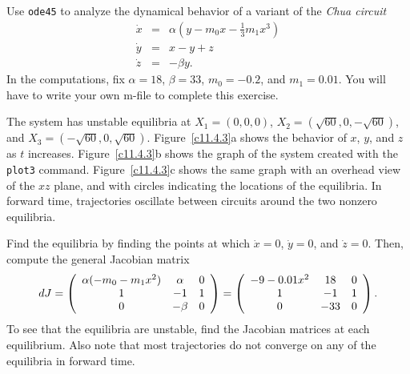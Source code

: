 \documentclass{ximera}
\begin{document}
\begin{computerExercise} \label{c11.4.3}
Use {\tt ode45} to analyze the dynamical behavior of a variant of the 
{\em Chua circuit}
\begin{eqnarray*}
  \dot{x} &=& \alpha\left(y-m_0x-\frac{1}{3}m_1x^3\right) \\
  \dot{y} &=& x-y+z \\
  \dot{z} &=& - \beta y.
\end{eqnarray*}
In the computations, fix $\alpha=18$, $\beta=33$, $m_0=-0.2$, and $m_1=0.01$.
You will have to write your own m-file to complete this exercise. 

\begin{solution}

\ans The system has unstable equilibria at $X_1 = (0,0,0)$,
$X_2 = (\sqrt{60},0, -\sqrt{60})$, and $X_3 = (-\sqrt{60},0,\sqrt{60})$.
Figure~\ref{c11.4.3}a shows the behavior of $x$, $y$, and $z$ as $t$
increases.  Figure~\ref{c11.4.3}b shows the graph of the system created
with the {\tt plot3} command.  Figure~\ref{c11.4.3}c shows the same graph
with an overhead view of the $xz$ plane, and with circles indicating the
locations of the equilibria.  In forward time, trajectories oscillate
between circuits around the two nonzero equilibria.

\soln Find the equilibria by finding the points at which $\dot{x} = 0$,
$\dot{y} = 0$, and $\dot{z} = 0$.  Then, compute the general Jacobian
matrix
\[
dJ = \left(\begin{array}{ccc} \alpha(-m_0 - m_1x^2) & \alpha & 0 \\ 1 & -1 & 1 \\ 0 & -\beta & 0\end{array}\right)
= \left(\begin{array}{ccc} -9 - 0.01x^2 & 18 & 0 \\ 1 & -1 & 1 \\ 0 & -33 & 0\end{array}\right).
\]
To see that the equilibria are unstable, find the Jacobian matrices at
each equilibrium.  Also note that most trajectories do not converge on
any of the equilibria in forward time.

\begin{figure}[htb]
                       \centerline{%
			\hspace{0.5in}
			\hspace{0.3in}
                       }
\end{figure}


\end{solution}
\end{computerExercise}
\end{document}

